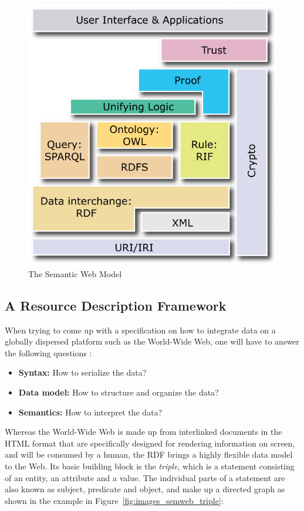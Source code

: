 \begin{figure}[!ht]
	\centering
		\includegraphics[width=0.8\columnwidth]{images/semantic_web_layers.png}
	\caption[The Semantic Web Model]{The Semantic Web Model \citep{W3C2013}}
\label{fig:images_semweb_model}
\end{figure}


\subsection{A Resource Description Framework}
\label{sec:semantic_rdf}

When trying to come up with a specification on how to integrate data on a globally dispersed platform such as the World-Wide Web, one will have to answer the following questions \citep[pg.23-25]{antoniou2012semantic}: \@

\begin{itemize}
	\item \textbf{Syntax:} How to serialize the data?
	\item \textbf{Data model:} How to structure and organize the data?
	\item \textbf{Semantics:} How to interpret the data?
\end{itemize}

Whereas the World-Wide Web is made up from interlinked documents in the \gls{HTML} format that are specifically designed for rendering information on screen, and will be consumed by a human, the \gls{RDF} brings a highly flexible data model to the Web. Its basic building block is the \emph{triple}, which is a statement consisting of an entity, an attribute and a value. The individual parts of a statement are also known as subject, predicate and object, and make up a directed graph as shown in the example in Figure~\ref{fig:images_semweb_triple}: \@

